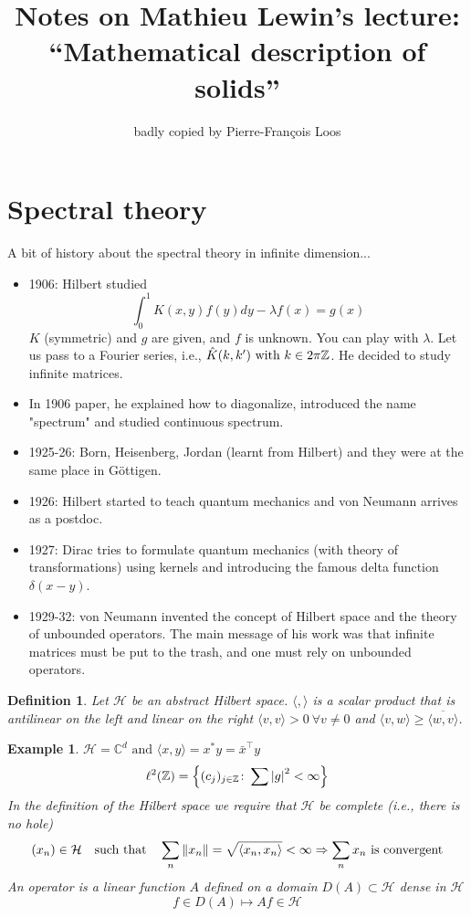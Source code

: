 \documentclass{article}
\title{Notes on Mathieu Lewin's lecture: ``Mathematical description of solids''}
\author{badly copied by Pierre-Fran\c{c}ois Loos}
\newtheorem*{definition}{Definition}
\newtheorem*{example}{Example}
\newcommand{\ZZ}{\mathbb{Z}}
\newcommand{\CC}{\mathbb{C}}
\newcommand{\cH}{\mathcal{H}}
\newcommand{\hK}{\Hat{K}}
\newcommand{\la}{\lambda}
\renewcommand{\sp}[2]{\langle #1,#2 \rangle}
\newcommand{\T}[1]{#1^{\intercal}}
\begin{document}
\maketitle

\section{Spectral theory}

A bit of history about the spectral theory in infinite dimension...
\begin{itemize}
  \item 1906: Hilbert studied
  $$ \int_0^1 K(x,y) f(y) dy - \la f(x) = g(x) $$
  $K$ (symmetric) and $g$ are given, and $f$ is unknown.
  You can play with $\la$.
  Let us pass to a Fourier series, i.e., $\hK(k,k') \text{ with } k \in 2\pi \ZZ $.
  He decided to study infinite matrices.
  \item In 1906 paper, he explained how to diagonalize, introduced the name "spectrum" and studied continuous spectrum.
  \item 1925-26: Born, Heisenberg, Jordan (learnt from Hilbert) and they were at the same place in G\"ottigen.
  \item 1926: Hilbert started to teach quantum mechanics and von Neumann arrives as a postdoc.
  \item 1927: Dirac tries to formulate quantum mechanics (with theory of transformations) using kernels and introducing the famous delta function $\delta(x-y)$.
  \item 1929-32: von Neumann invented the concept of Hilbert space and the theory of unbounded operators. 
  The main message of his work was that infinite matrices must be put to the trash, and one must rely on unbounded operators.
\end{itemize}

\begin{definition} 
  Let $\cH$ be an abstract Hilbert space.
  $\sp{}{}$ is a scalar product that is antilinear on the left and linear on the right
  $\sp{v}{v} > 0 \ \forall v \neq 0$ and $\sp{v}{w} \ge \overline{\sp{w}{v}}$.
\end{definition} 

\begin{example} 
  $\cH = \CC^d \text{ and } \sp{x}{y} = x^* y = \T{\bar{x}} y $
  $$ \ell^2(\ZZ) = \qty{ (c_j)_{j \in \ZZ} \colon \sum \abs{g}^2 < \infty } $$
  In the definition of the Hilbert space we require that $\cH$ be complete (i.e., there is no hole) 
  $$ (x_n) \in \cH \qq{such that} \sum_n \norm{x_n} = \sqrt{\sp{x_n}{x_n}} < \infty \Rightarrow \sum_n x_n \text{ is convergent} $$
  An operator is a linear function $A$ defined on a domain $D(A) \subset \cH$ dense in $\cH$
  $$ f \in D(A) \mapsto A f \in \cH $$
\end{example} 
\end{document}
